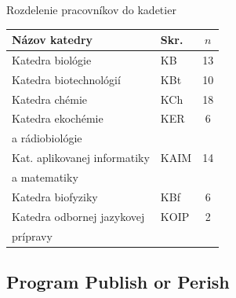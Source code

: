 \documentclass{beamer}
\begin{document}
%
%
\begin{frame}{Rozdelenie pracovníkov do kadetier}

  \begin{table}
    \centering\small
    \begin{tabular}{llc}
      \toprule%
      Názov katedry                   & Skr.    & $n$\\%
      \midrule%
      Katedra biológie                & KB      & 13 \\%
      Katedra biotechnológií          & KBt     & 10 \\%
      Katedra chémie                  & KCh     & 18 \\%
      Katedra ekochémie               & KER     & 6 \\[-0.25ex]
      a rádiobiológie                 &         &                                             \\ [0.5ex]
      Kat. aplikovanej informatiky    & KAIM    & 14 \\%
      a matematiky                    &         &                                              \\[0.5ex]
      Katedra biofyziky               & KBf     & 6 \\%
      Katedra odbornej jazykovej      & KOIP    & 2 \\[-0.25ex]
      prípravy                        &         &                                              \\[0.5ex]
      \bottomrule
    \end{tabular}
  \end{table}


\end{frame}

%
%


\subsection{Program Publish or Perish}
\end{document}
